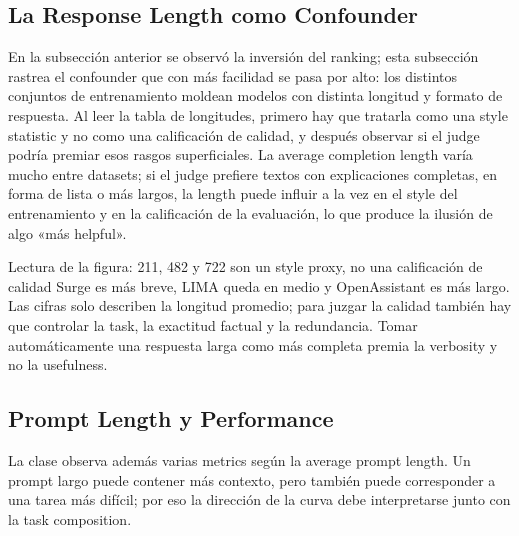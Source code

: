 
\subsection{La Response Length como Confounder}

En la subsección anterior se observó la inversión del ranking; esta subsección rastrea el confounder que con más facilidad se pasa por alto: los distintos conjuntos de entrenamiento moldean modelos con distinta longitud y formato de respuesta. Al leer la tabla de longitudes, primero hay que tratarla como una style statistic y no como una calificación de calidad, y después observar si el judge podría premiar esos rasgos superficiales. La average completion length varía mucho entre datasets; si el judge prefiere textos con explicaciones completas, en forma de lista o más largos, la length puede influir a la vez en el style del entrenamiento y en la calificación de la evaluación, lo que produce la ilusión de algo «más helpful».


\begin{knowledgebox}{Lectura de la figura: 211, 482 y 722 son un style proxy, no una calificación de calidad}
Surge es más breve, LIMA queda en medio y OpenAssistant es más largo. Las cifras solo describen la longitud promedio; para juzgar la calidad también hay que controlar la task, la exactitud factual y la redundancia. Tomar automáticamente una respuesta larga como más completa premia la verbosity y no la usefulness.
\end{knowledgebox}

\subsection{Prompt Length y Performance}

La clase observa además varias metrics según la average prompt length. Un prompt largo puede contener más contexto, pero también puede corresponder a una tarea más difícil; por eso la dirección de la curva debe interpretarse junto con la task composition.


